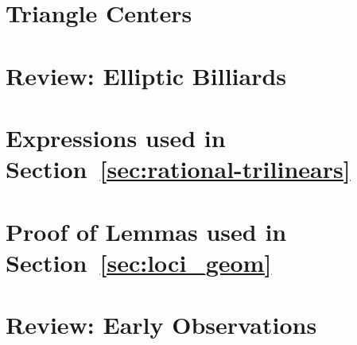 \section{Triangle Centers}
\label{app:triangle-centers}


\section{Review: Elliptic Billiards}
\label{app:billiards}


\section{Expressions used in Section~\ref{sec:rational-trilinears}}
\label{app:rational-support}


\section{Proof of Lemmas used in Section~\ref{sec:loci_geom}}
\label{app:method-lemmas}


% 

%

\section{Review: Early Observations}
\label{app:early}

